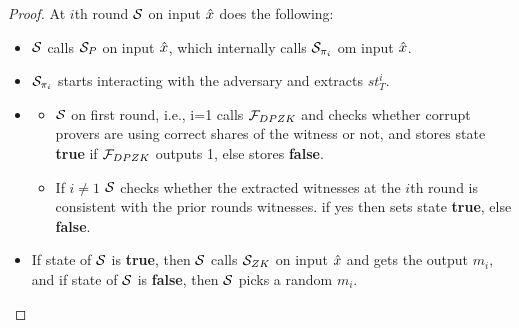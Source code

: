\begin{proof}
	At $i$th round $\mathcal{S}$ on input $\hat{x}$ does the following: 
	\begin{itemize}
		\item $\mathcal{S}$ calls $\mathcal{S}_P$ on input $\hat{x}$, which internally calls $\mathcal{S}_{\pi_i}$ om input $\hat{x}$. 
		
		\item $\mathcal{S}_{\pi_i}$ starts interacting with the adversary and extracts $st^i_T$.
		
		\item 
		\begin{itemize} 
			\item $\mathcal{S}$ on first round, i.e., i=1 calls $\mathcal{F}_{DPZK}$ and checks whether corrupt provers are using correct shares of the witness or not, and stores state {\bf true} if $\mathcal{F}_{DPZK}$ outputs 1, else stores {\bf false}.
			\item If $i \neq 1$ $\mathcal{S}$ checks whether the extracted witnesses at the $i$th round is consistent with the prior rounds witnesses. if yes then sets state {\bf true}, else {\bf false}.
		\end{itemize}
		\item If state of $\mathcal{S}$ is {\bf true}, then $\mathcal{S}$ calls $\mathcal{S}_{ZK}$ on input $\hat{x}$ and gets the output $m_i$, and if state of $\mathcal{S}$ is {\bf false}, then $\mathcal{S}$ picks a random $m_i$.
		

\end{itemize}
\end{proof}
